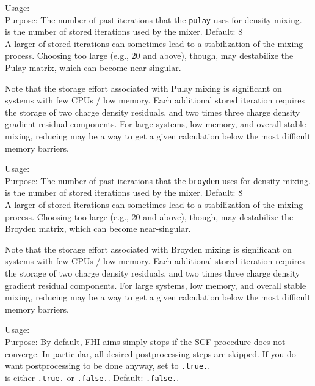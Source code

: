 {
  \noindent
  Usage:   \\[1.0ex]
  Purpose: The number of past iterations that the \texttt{pulay}
     uses for density mixing. \\[1.0ex]
   is the number of stored iterations used by the
    mixer. Default: 8 \\
}
A larger  of stored iterations can sometimes lead to a
stabilization of the mixing process. Choosing  too
large (e.g., 20 and above), though, may destabilize the Pulay matrix,
which can become near-singular.

Note that the storage effort associated with Pulay mixing is
significant on systems with few CPUs / low memory. Each additional
stored iteration requires the storage of two charge density
residuals, and two times three charge density gradient residual
components. For large systems, low memory, and overall stable mixing,
reducing  may be a way to get a given
calculation below the most difficult memory barriers.

{
  \noindent
  Usage:   \\[1.0ex]
  Purpose: The number of past iterations that the \texttt{broyden}
     uses for density mixing. \\[1.0ex]
   is the number of stored iterations used by the
    mixer. Default: 8 \\
}
A larger  of stored iterations can sometimes lead to a
stabilization of the mixing process. Choosing  too
large (e.g., 20 and above), though, may destabilize the Broyden matrix,
which can become near-singular.

Note that the storage effort associated with Broyden mixing is
significant on systems with few CPUs / low memory. Each additional
stored iteration requires the storage of two charge density
residuals, and two times three charge density gradient residual
components. For large systems, low memory, and overall stable mixing,
reducing  may be a way to get a given
calculation below the most difficult memory barriers.

{
  \noindent
  Usage:   \\[1.0ex]
  Purpose: By default, FHI-aims simply stops if the SCF procedure does not
  converge.  In particular, all desired postprocessing steps are skipped.  If
  you do want postprocessing to be done anyway, set  to
  \texttt{.true.}. \\[1.0ex]
   is either \texttt{.true.} or \texttt{.false.}. Default:
  \texttt{.false.}.
  \\
}

